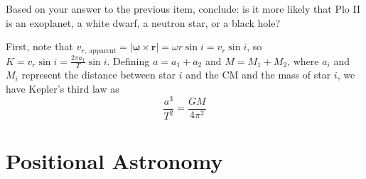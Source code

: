 \documentclass[11pt]{article}
\begin{document}
\begin{pproblem}
\begin{alternativas}
        \item Based on your answer to the previous item, conclude: is it more likely that Plo II is an exoplanet, a white dwarf, a neutron star, or a black hole?
    \end{alternativas}
    \begin{pssolution*}{}{}
        \begin{alternativas}
            \item First, note that \(v_{r,\ \mathrm{apparent}} = |\mathbf{\omega}\times\mathbf{r}| = \omega r \sin i = v_r \sin i\), so \(K = v_r\sin i = \frac{2\pi a_1}{T}\sin i\). Defining \(a=a_1+a_2\) and \(M = M_1+M_2\), where \(a_i\) and \(M_i\) represent the distance between star \(i\) and the CM and the mass of star \(i\), we have Kepler's third law as
            \[\frac{a^3}{T^2} = \frac{GM}{4\pi^2}\]
        \end{alternativas}
    \end{pssolution*}
\end{pproblem}

\newpage

\section{Positional Astronomy}
\end{document}
